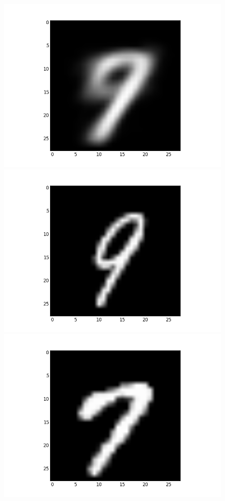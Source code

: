 \documentclass[submit]{harvardml}
\begin{document}
\begin{figure}[ht]
    \centering
    \includegraphics[scale=0.20]{mean-0}
    \includegraphics[scale=0.20]{representative-0-0}
    \includegraphics[scale=0.20]{representative-0-1}

\end{figure}
\end{document}
